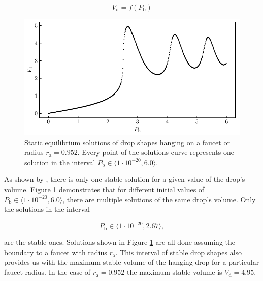     \begin{equation}
        V_{\mathrm{d}} = f(P_{\mathrm{b}}) 
    \end{equation}

    \begin{figure}[H]
    \begin{center}
        \includegraphics[width=1.0\columnwidth]{img/plot_drop_equilibrium_faucet_pv.pdf}
    \end{center}
        \caption{Static equilibrium solutions of drop shapes hanging on a faucet or radius $r_{\mathrm{a}} = 0.952$. Every point of the solutions curve represents one solution in the interval $P_{\mathrm{b}} \in \langle 1 \cdot 10^{-20}, 6.0 \rangle$.} 
    \label{fig:plot_drop_equilibrium_faucet_pv}
    \end{figure}
        

    As shown by \citep{padday1973}, there is only one stable solution for a given value of the drop's volume. Figure \ref{fig:plot_drop_equilibrium_faucet_pv} demonstrates that for different initial values of $P_{\mathrm{b}} \in \langle 1 \cdot 10^{-20}, 6.0 \rangle$, there are multiple solutions of the same drop's volume. Only the solutions in the interval

    \begin{equation}
        P_{\mathrm{b}} \in \langle 1 \cdot 10^{-20}, 2.67 \rangle,
    \end{equation}

    are the stable ones. Solutions shown in Figure \ref{fig:plot_drop_equilibrium_faucet_pv} are all done assuming the boundary to a faucet with radius $r_{\mathrm{a}}$. This interval of stable drop shapes also provides us with the maximum stable volume of the hanging drop for a particular faucet radius. In the case of $r_{\mathrm{a}} = 0.952$ the maximum stable volume is $V_{\mathrm{d}} = 4.95$.

